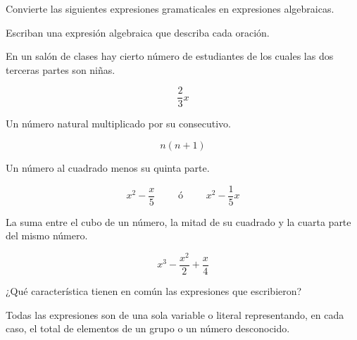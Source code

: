 Convierte las siguientes expresiones gramaticales en expresiones algebraicas.

\begin{parts}
    Escriban una expresión algebraica que describa cada oración.

    \begin{subparts}
        \subpart En un salón de clases hay cierto número de estudiantes de los cuales las dos terceras partes son niñas.

        \begin{solutionbox}{1.6cm}
            \[\dfrac{2}{3}x\]
        \end{solutionbox}

        \subpart Un número natural multiplicado por su consecutivo.

        \begin{solutionbox}{1.6cm}
            \[n\left(n+1\right)\]
        \end{solutionbox}

        \subpart Un número al cuadrado menos su quinta parte.

        \begin{solutionbox}{1.6cm}
            \[x^2-\dfrac{x}{5} \qquad\text{ ó }\qquad x^2-\dfrac{1}{5}x\]
        \end{solutionbox}

        \subpart La suma entre el cubo de un número, la mitad de su cuadrado y la cuarta parte del mismo número.

        \begin{solutionbox}{1.6cm}
            \[x^3-\dfrac{x^2}{2}+\dfrac{x}{4}\]
        \end{solutionbox}

    \end{subparts}

    ¿Qué característica tienen en común las expresiones que escribieron?

    \begin{solutionbox}{2cm}
        Todas las expresiones son de una sola variable o literal representando,
        en cada caso, el total de elementos de un grupo o un número desconocido.
    \end{solutionbox}
\end{parts}